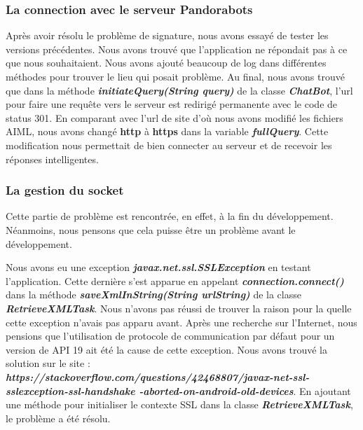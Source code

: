 \subsubsection{La connection avec le serveur Pandorabots}

\indent Après avoir résolu le problème de signature, nous avons essayé de tester les versions précédentes. Nous avons trouvé que l'application ne répondait pas à ce que nous souhaitaient. Nous avons ajouté beaucoup de log dans différentes méthodes pour trouver le lieu qui posait problème. Au final, nous avons trouvé que dans la méthode \textbf{\emph{initiateQuery(String query)}} de la classe \textbf{\emph{ChatBot}}, l'url pour faire une requête vers le serveur est redirigé permanente avec le code de status 301. En comparant avec l'url de site d'où nous avons modifié les fichiers AIML, nous avons changé \textbf{http} à \textbf{https} dans la variable \textbf{\emph{fullQuery}}. Cette modification nous permettait de bien connecter au serveur et de recevoir les réponses intelligentes.

\subsubsection{La gestion du socket}

\indent Cette partie de problème est rencontrée, en effet, à la fin du développement. Néanmoins, nous pensons que cela puisse être un problème avant le développement.

\indent Nous avons eu une exception \textbf{\emph{javax.net.ssl.SSLException}} en testant l'application. Cette dernière s'est apparue en appelant \textbf{\emph{connection.connect()}} dans la méthode \textbf{\emph{saveXmlInString(String urlString)}} de la classe \textbf{\emph{RetrieveXMLTask}}. Nous n'avons pas réussi de trouver la raison pour la quelle cette exception n'avais pas apparu avant. Après une recherche sur l'Internet, nous pensions que l'utilisation de protocole de communication par défaut pour un version de API 19 ait été la cause de cette exception. Nous avons trouvé la solution sur le site : \textbf{\emph{https://stackoverflow.com/questions/42468807/javax-net-ssl-sslexception-ssl-handshake -aborted-on-android-old-devices}}. En ajoutant une méthode pour initialiser le contexte SSL dans la classe \textbf{\emph{RetrieveXMLTask}}, le problème a été résolu.

\newpage
